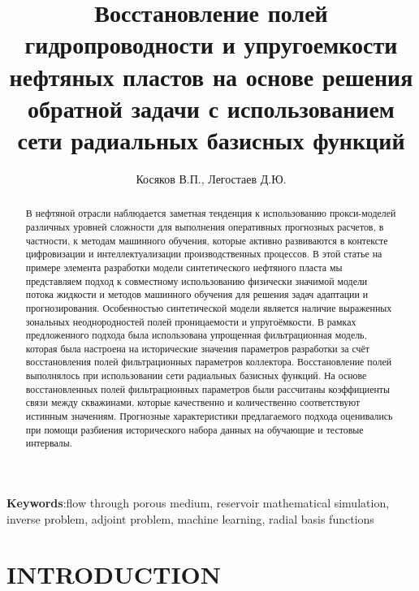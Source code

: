 \documentclass{article}
\begin{document}
\title{Восстановление полей гидропроводности и упругоемкости нефтяных пластов на основе решения обратной задачи с использованием сети радиальных базисных функций} %
\author{Косяков В.П., Легостаев Д.Ю.} %




\begin{abstract} %
В нефтяной отрасли наблюдается заметная тенденция к использованию прокси-моделей различных уровней сложности для выполнения оперативных прогнозных расчетов, в частности, к методам машинного обучения, которые активно развиваются в контексте цифровизации и интеллектуализации производственных процессов. В этой статье на примере элемента разработки модели синтетического нефтяного пласта мы представляем подход к совместному использованию физически значимой модели потока жидкости и методов машинного обучения для решения задач адаптации и прогнозирования. Особенностью синтетической модели является наличие выраженных зональных неоднородностей полей проницаемости и упругоёмкости. В рамках предложенного подхода была использована упрощенная фильтрационная модель, которая была настроена на исторические значения параметров разработки за счёт восстановления полей фильтрационных параметров коллектора. Восстановление полей выполнялось при использовании сети радиальных базисных функций. На основе восстановленных полей фильтрационных параметров были рассчитаны коэффициенты связи между скважинами, которые качественно и количественно соответствуют истинным значениям. Прогнозные характеристики предлагаемого подхода оценивались при помощи разбиения исторического набора данных на обучающие и тестовые интервалы.
\end{abstract}

\textbf{Keywords}:flow through porous medium, reservoir mathematical simulation, inverse problem, adjoint problem, machine learning, radial basis functions%

\maketitle

\section{INTRODUCTION}
\end{document}
